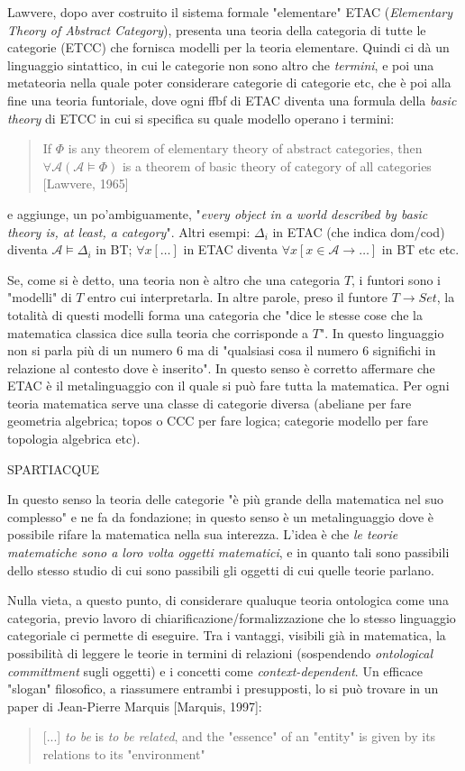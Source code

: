 \documentclass[a4paper, 11pt]{article}
\begin{document}
Lawvere, dopo aver costruito il sistema formale "elementare" ETAC (\emph{Elementary Theory of Abstract Category}), presenta una teoria della categoria di tutte le categorie (ETCC) che fornisca modelli per la teoria elementare. Quindi ci dà un linguaggio sintattico, in cui le categorie non sono altro che \emph{termini}, e poi una metateoria nella quale poter considerare categorie di categorie etc, che è poi alla fine una teoria funtoriale, dove ogni ffbf di ETAC diventa una formula della \emph{basic theory} di ETCC in cui si specifica su quale modello operano i termini:
\begin{quotation}
	If $\Phi$ is any theorem of elementary theory of abstract categories, then $ \forall \mathcal{A} (\mathcal{A} \models \Phi)$ is a theorem of basic theory of category of all categories [Lawvere, 1965]
\end{quotation}
e aggiunge, un po'ambiguamente, "\textit{every object in a world described by basic theory is, at least, a category}". Altri esempi: $\Delta_i$ in ETAC (che indica dom/cod) diventa $\mathcal{A} \models \Delta_i$ in BT; $\forall x [\dots]$ in ETAC diventa $\forall x [x \in \mathcal{A} \rightarrow \dots]$ in BT etc etc.


	Se, come si è detto, una teoria non è altro che una categoria $T$, i funtori sono i "modelli" di $T$ entro cui interpretarla. In altre parole, preso il funtore $T \to Set$, la totalità di questi modelli forma una categoria che "dice le stesse cose che la matematica classica dice sulla teoria che corrisponde a $T$". In questo linguaggio non si parla più di un numero 6 ma di "qualsiasi cosa il numero 6 significhi in relazione al contesto dove è inserito". 
	In questo senso è corretto affermare che ETAC è il metalinguaggio con il quale si può fare tutta la matematica. Per ogni teoria matematica serve una classe di categorie diversa (abeliane per fare geometria algebrica; topos o CCC per fare logica; categorie modello per fare topologia algebrica etc). 
	
	SPARTIACQUE
	
	In questo senso la teoria delle categorie "è più grande della matematica nel suo complesso" e ne fa da fondazione; in questo senso è un metalinguaggio dove è possibile rifare la matematica nella sua interezza. L'idea è che \emph{le teorie matematiche sono a loro volta oggetti matematici}, e in quanto tali sono passibili dello stesso studio di cui sono passibili gli oggetti di cui quelle teorie parlano.
	
	 Nulla vieta, a questo punto, di considerare qualuque teoria ontologica come una categoria, previo lavoro di chiarificazione/formalizzazione che lo stesso linguaggio categoriale ci permette di eseguire. Tra i vantaggi, visibili già in matematica, la possibilità di leggere le teorie in termini di relazioni (sospendendo \emph{ontological committment} sugli oggetti) e i concetti come \emph{context-dependent}. Un efficace "slogan" filosofico, a riassumere entrambi i presupposti, lo si può trovare in un paper di Jean-Pierre Marquis [Marquis, 1997]:
	 \begin{quote}
	 	[...] \emph{to be} is \emph{to be related}, and the "essence" of an "entity" is given by its relations to its "environment"
	 \end{quote}
	 
\end{document}

